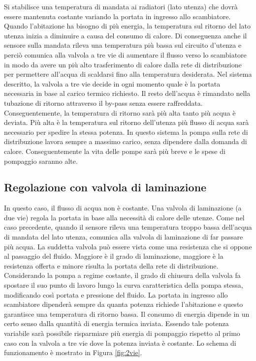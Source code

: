 \documentclass[laurea,oneside,11pt]{USiena_tesiLM}
\begin{document}
Si stabilisce una temperatura di mandata ai radiatori (lato utenza) che dovrà essere mantenuta costante variando la portata in ingresso allo scambiatore. Quando l'abitazione ha bisogno di più energia, la temperatura sul ritorno del lato utenza inizia a diminuire a causa del consumo di calore. Di conseguenza anche il sensore sulla mandata rileva una temperatura più bassa sul circuito d'utenza  e perciò comunica alla valvola a tre vie di aumentare il flusso verso lo scambiatore in modo da avere un più alto trasferimento di calore dalla rete di distribuzione per permettere all'acqua di scaldarsi fino alla temperatura desiderata.
Nel sistema descritto, la valvola a tre vie decide in ogni momento quale è la portata necessaria in base al carico termico richiesto. Il resto dell'acqua è rimandato nella tubazione di ritorno attraverso il by-pass senza essere raffreddata. Conseguentemente, la temperatura di ritorno sarà più alta tanto più acqua è deviata. Più alta è la temperatura sul ritorno dell'utenza     più flusso di acqua sarà necessario per spedire la stessa potenza. In questo sistema la pompa sulla rete di distribuzione lavora sempre a massimo carico, senza dipendere dalla domanda di calore. Conseguentemente la vita delle pompe sarà più breve e le spese di pompaggio saranno alte.

\subsection{Regolazione con valvola di laminazione}
\label{subsec:2vie}
In questo caso, il flusso di acqua non è costante. Una valvola di laminazione (a due vie) regola la portata in base alla necessità di calore delle utenze. 
Come nel caso precedente, quando il sensore rileva una temperatura troppo bassa dell'acqua di mandata del lato utenza, comunica alla valvola di laminazione di far passare più acqua. 
La suddetta valvola può essere vista come una resistenza che si oppone al passaggio del fluido. Maggiore è il grado di laminazione, maggiore è la resistenza offerta e minore risulta la portata della rete di distribuzione. Considerando la pompa a regime costante, il grado di chiusura della valvola fa spostare il suo punto di lavoro lungo la curva caratteristica della pompa stessa, modificando così portata e pressione del fluido.
La portata in ingresso allo scambiatore dipenderà sempre da quanta potenza richiede l'abitazione e questo garantisce una temperatura di ritorno bassa. 
Il consumo di energia dipende in un certo senso dalla quantità di energia termica inviata. Essendo tale potenza variabile sarà possibile risparmiare più energia di pompaggio rispetto al primo caso con la valvola a tre vie dove la potenza inviata è costante. Lo schema di funzionamento è mostrato in Figura \ref{fig:2vie}.
\end{document}
